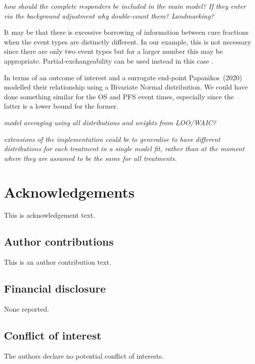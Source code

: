 \documentclass[AMA,STIX1COL]{WileyNJD-v2}
\begin{document}
{\it how should the complete responders be included in the main model? If they enter via the background adjustment why double-count them? Landmarking?}

It may be that there is excessive borrowing of information between cure fractions when the event types are distinctly different.
In our example, this is not necessary since there are only two event types but for a larger number this may be appropriate.
Partial-exchangeability can be used instead in this case \cite{Neuenschwander2016}.

In terms of an outcome of interest and a surrogate end-point Papanikos~(2020) \cite{Papanikos2020} modelled their relationship using a Bivariate Normal distribution.
We could have done something similar for the OS and PFS event times, especially since the latter is a lower bound for the former.

{\it model averaging using all distributions and weights from LOO/WAIC?}

{\it extensions of the implementation could be to generalise to have different distributions for each treatment in a single model fit, rather than at the moment where they are assumed to be the same for all treatments.}



\section*{Acknowledgements}
This is acknowledgement text.

\subsection*{Author contributions}

This is an author contribution text.

\subsection*{Financial disclosure}

None reported.

\subsection*{Conflict of interest}

The authors declare no potential conflict of interests.


\end{document}
